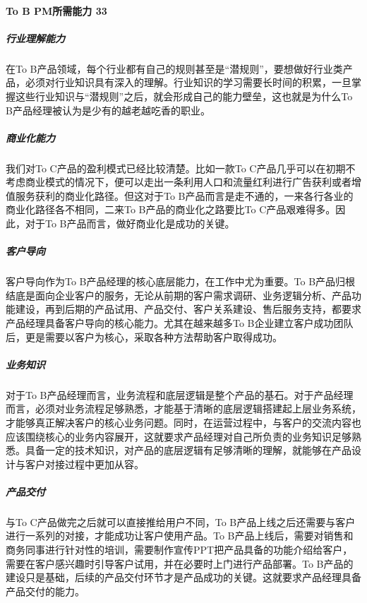 \documentclass[letterpaper,11pt,english]{sphinxmanual}
\begin{document}
\paragraph{To B PM所需能力 33\sphinxfootnotemark[63]}
\label{\detokenize{chapter_introduction/2B:to-b-pm-33}}%
\begin{footnotetext}[63]\sphinxAtStartFootnote
{}
%
\end{footnotetext}\ignorespaces 

\subparagraph{行业理解能力}
\label{\detokenize{chapter_introduction/2B:id32}}
在To
B产品领域，每个行业都有自己的规则甚至是“潜规则”，要想做好行业类产品，必须对行业知识具有深入的理解。行业知识的学习需要长时间的积累，一旦掌握这些行业知识与“潜规则”之后，就会形成自己的能力壁垒，这也就是为什么To
B产品经理被认为是少有的越老越吃香的职业。


\subparagraph{商业化能力}
\label{\detokenize{chapter_introduction/2B:id33}}
我们对To C产品的盈利模式已经比较清楚。比如一款To
C产品几乎可以在初期不考虑商业模式的情况下，便可以走出一条利用人口和流量红利进行广告获利或者增值服务获利的商业化路径。但这对于To
B产品而言是走不通的，一来各行各业的商业化路径各不相同，二来To
B产品的商业化之路要比To C产品艰难得多。因此，对于To
B产品而言，做好商业化是成功的关键。


\subparagraph{客户导向}
\label{\detokenize{chapter_introduction/2B:id34}}
客户导向作为To B产品经理的核心底层能力，在工作中尤为重要。To
B产品归根结底是面向企业客户的服务，无论从前期的客户需求调研、业务逻辑分析、产品功能建设，再到后期的产品试用、产品交付、客户关系建设、售后服务支持，都要求产品经理具备客户导向的核心能力。尤其在越来越多To
B企业建立客户成功团队后，更是需要以客户为核心，采取各种方法帮助客户取得成功。


\subparagraph{业务知识}
\label{\detokenize{chapter_introduction/2B:id35}}
对于To
B产品经理而言，业务流程和底层逻辑是整个产品的基石。对于产品经理而言，必须对业务流程足够熟悉，才能基于清晰的底层逻辑搭建起上层业务系统，才能够真正解决客户的核心业务问题。同时，在运营过程中，与客户的交流内容也应该围绕核心的业务内容展开，这就要求产品经理对自己所负责的业务知识足够熟悉。具备一定的技术知识，对产品的底层逻辑有足够清晰的理解，就能够在产品设计与客户对接过程中更加从容。


\subparagraph{产品交付}
\label{\detokenize{chapter_introduction/2B:id36}}
与To C产品做完之后就可以直接推给用户不同，To
B产品上线之后还需要与客户进行一系列的对接，才能成功让客户使用产品。To
B产品上线后，需要对销售和商务同事进行针对性的培训，需要制作宣传PPT把产品具备的功能介绍给客户，需要在客户感兴趣时引导客户试用，并在必要时上门进行产品部署。To
B产品的建设只是基础，后续的产品交付环节才是产品成功的关键。这就要求产品经理具备产品交付的能力。
\end{document}
